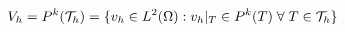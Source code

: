 \begin{frame}
\begin{columns}
\begin{column}{0.3\textwidth}
{    }
    \end{column}
    \begin{column}{0.7\textwidth}
    \end{column}
  \end{columns}
  \hspace{2em}
  \begin{equation*}
    V_h = P^k(\mathcal{T}_h) = \{ v_h \in L^2(\Omega): v_h|_{T} \in P^k(T)\; \forall \; T \in
    \mathcal{T}_h\} 
  \end{equation*}
\end{frame}

